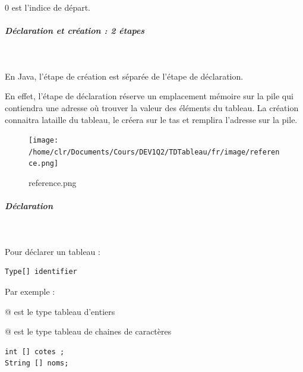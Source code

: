 \documentclass[11pt,a4paper]{article}
\begin{document}
            \par
        0 est l'indice de d\'epart.
            \par
        
			
		\subparagraph{D\'eclaration et cr\'eation : 2 \'etapes} 
		
					\textcolor{white}{.} \par
				
        En Java, l'\'etape de cr\'eation est s\'epar\'ee de l'\'etape de d\'eclaration. \par
				
        En effet, l'\'etape de d\'eclaration r\'eserve un emplacement m\'emoire sur la pile qui contiendra une adresse 
        o\`u trouver la valeur des \'el\'ements du tableau. 
        La cr\'eation connaitra lataille du tableau, le cr\'eera sur le tas et remplira l'adresse sur la pile.
      
            \par
        \begin{figure}[hbt]
				    \begin{center}
					\texttt{[image: /home/clr/Documents/Cours/DEV1Q2/TDTableau/fr/image/reference.png]}
						\end{center}
                
                    \caption[reference.png]{reference.png}
                \end{figure}
                    
            \par
        
			
		\subparagraph{D\'eclaration} 
		
					\textcolor{white}{.} \par
				
        Pour d\'eclarer un tableau : 
      
            \par
        \begin{verbatim}
Type[] identifier
      \end{verbatim}
        Par exemple :\par
				\verb@int []@ est le type tableau d'entiers\par
				\verb@String []@ est le type tableau de chaines de caract\`eres
      
            \par
        \begin{verbatim}
int [] cotes ;
String [] noms;
      \end{verbatim}
			
\end{document}
